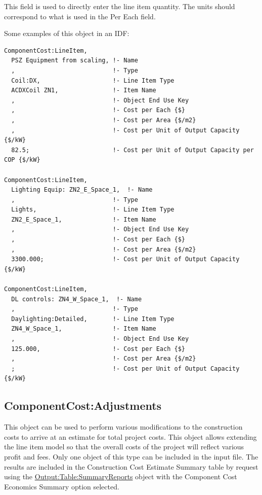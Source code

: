 This field is used to directly enter the line item quantity. The units should correspond to what is used in the Per Each field.

Some examples of this object in an IDF:

\begin{lstlisting}
ComponentCost:LineItem,
  PSZ Equipment from scaling, !- Name
  ,                           !- Type
  Coil:DX,                    !- Line Item Type
  ACDXCoil ZN1,               !- Item Name
  ,                           !- Object End Use Key
  ,                           !- Cost per Each {$}
  ,                           !- Cost per Area {$/m2}
  ,                           !- Cost per Unit of Output Capacity {$/kW}
  82.5;                       !- Cost per Unit of Output Capacity per COP {$/kW}

ComponentCost:LineItem,
  Lighting Equip: ZN2_E_Space_1,  !- Name
  ,                           !- Type
  Lights,                     !- Line Item Type
  ZN2_E_Space_1,              !- Item Name
  ,                           !- Object End Use Key
  ,                           !- Cost per Each {$}
  ,                           !- Cost per Area {$/m2}
  3300.000;                   !- Cost per Unit of Output Capacity {$/kW}

ComponentCost:LineItem,
  DL controls: ZN4_W_Space_1,  !- Name
  ,                           !- Type
  Daylighting:Detailed,       !- Line Item Type
  ZN4_W_Space_1,              !- Item Name
  ,                           !- Object End Use Key
  125.000,                    !- Cost per Each {$}
  ,                           !- Cost per Area {$/m2}
  ;                           !- Cost per Unit of Output Capacity {$/kW}
\end{lstlisting}

\subsection{ComponentCost:Adjustments}\label{componentcostadjustments}

This object can be used to perform various modifications to the construction costs to arrive at an estimate for total project costs. This object allows extending the line item model so that the overall costs of the project will reflect various profit and fees. Only one object of this type can be included in the input file. The results are included in the Construction Cost Estimate Summary table by request using the \hyperref[outputtablesummaryreports]{Output:Table:SummaryReports} object with the Component Cost Economics Summary option selected.

